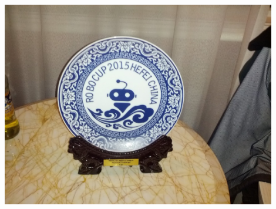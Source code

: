 \begin{frame}
\begin{columns}
\begin{column}{0.5\textwidth}
  \includegraphics[width=0.9\textwidth]{images/preis}
  \end{column}
  \end{columns}
\end{frame}

\backupend


